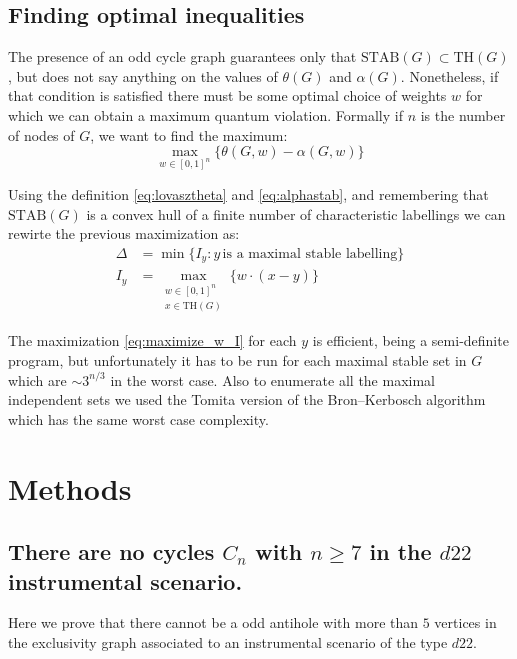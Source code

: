 \documentclass[
    nofootinbin,
    floatfix,
    amsfonts,
    twocolumn, 
    aps, 
    prl]{revtex4-1}
\newcommand{\STAB}{\mathrm{STAB}}
\renewcommand{\TH}{\mathrm{TH}}
\begin{document}
\subsection{Finding optimal inequalities}
The presence of an odd cycle graph guarantees only that $\STAB(G) \subset
\TH(G)$, but does not say anything on the values of $\theta(G)$ and $\alpha(G)$.
Nonetheless, if that condition is satisfied there must be some optimal choice of
weights $w$ for which we can obtain a maximum quantum violation.
Formally if $n$ is the number of nodes of $G$, we want to find the maximum:
\begin{equation}
    \max_{w \in [0,1]^n} \{\theta(G,w) - \alpha(G,w)\}
    \label{eq:maxonw}
\end{equation}

Using the definition \eqref{eq:lovasztheta} and \eqref{eq:alphastab}, and
remembering that $\STAB(G)$ is a convex hull of a finite number of
characteristic labellings we can rewirte the previous maximization as:
\begin{align}
    \Delta &= \min \{I_y : y \, \text{is a maximal stable labelling}\}
    \label{eq:maximize_w_delta}\\
    I_y &= \max_{\substack{w \in [0,1]^n\\x \in \TH(G)}} \{w\cdot (x - y)\}
    \label{eq:maximize_w_I}
\end{align}

The maximization \eqref{eq:maximize_w_I} for each $y$ is efficient, being a
semi-definite program, but unfortunately it has to be run for each maximal
stable set in $G$ which are $\sim 3^{n/3}$ in the worst case.
Also to enumerate all the maximal independent sets we used the Tomita version of
the Bron–Kerbosch algorithm which has the same worst case complexity. %

\section{Methods}
\subsection{There are no cycles $C_n$ with $n \ge 7$ in the $d22$ instrumental scenario.}
\label{sec:c5only_proof}
Here we prove that there cannot be a odd antihole with more than $5$ vertices in
the exclusivity graph associated to an instrumental scenario of the type $d22$.
\end{document}

